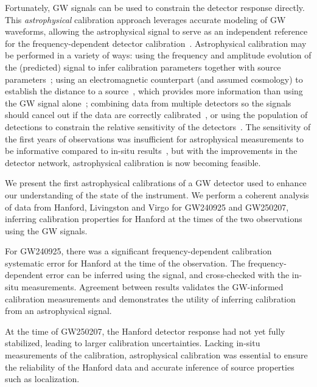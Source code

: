 Fortunately, \ac{GW} signals can be used to constrain the detector response directly.
This \emph{astrophysical} calibration approach leverages accurate modeling of \ac{GW} waveforms, allowing the astrophysical signal to serve as an independent reference for the frequency-dependent detector calibration~\cite{Schutz:1986gp,Essick:2019dow,LIGOScientific:2025hdt}.
Astrophysical calibration may be performed in a variety of ways: using the frequency and amplitude evolution of the (predicted) signal to infer calibration parameters together with source parameters~\cite{Essick:2019dow,Payne:2020myg,Vitale:2020gvb}; using an electromagnetic counterpart (and assumed cosmology) to establish the distance to a source~\cite{Pitkin:2015kgm}, which provides more information than using the \ac{GW} signal alone~\cite{Essick:2019dow}; combining data from multiple detectors so the signals should cancel out if the data are correctly calibrated~\cite{Schutz:2020hyz}, or using the population of detections to constrain the relative sensitivity of the detectors~\cite{Allene:2022nve}.
The sensitivity of the first years of observations was insufficient for astrophysical measurements to be informative compared to in-situ results~\cite{Essick:2019dow,Payne:2020myg,Vitale:2020gvb}, but with the improvements in the detector network, astrophysical calibration is now becoming feasible.

We present the first astrophysical calibrations of a \ac{GW} detector used to enhance our understanding of the state of the instrument.
We perform a coherent analysis of data from Hanford, Livingston and Virgo for \ac{GW240925} and \ac{GW250207}, inferring calibration properties for Hanford at the times of the two observations using the \ac{GW} signals.

For \ac{GW240925}, there was a significant frequency-dependent calibration systematic error for Hanford at the time of the observation.
The frequency-dependent error can be inferred using the signal, and cross-checked with the in-situ measurements.
Agreement between results validates the \ac{GW}-informed calibration measurements and demonstrates the utility of inferring calibration from an astrophysical signal.

At the time of \ac{GW250207}, the Hanford detector response had not yet fully stabilized, leading to larger calibration uncertainties.
Lacking in-situ measurements of the calibration, astrophysical calibration was essential to ensure the reliability of the Hanford data and accurate inference of source properties such as localization.


